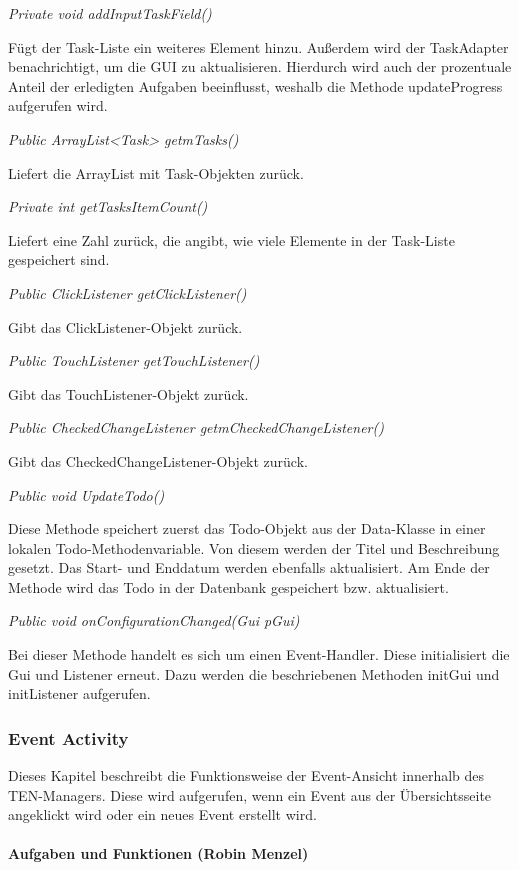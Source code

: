 \textit{Private void addInputTaskField()}

Fügt der Task-Liste ein weiteres Element hinzu. Außerdem wird der TaskAdapter benachrichtigt, um die GUI zu aktualisieren. Hierdurch wird auch der prozentuale Anteil der erledigten Aufgaben beeinflusst, weshalb die Methode updateProgress aufgerufen wird.

\textit{Public ArrayList<Task> getmTasks()}

Liefert die ArrayList mit Task-Objekten zurück.

\textit{Private int getTasksItemCount()}

Liefert eine Zahl zurück, die angibt, wie viele Elemente in der Task-Liste gespeichert sind.

\textit{Public ClickListener getClickListener()}

Gibt das ClickListener-Objekt zurück.

\textit{Public TouchListener getTouchListener()}

	Gibt das TouchListener-Objekt zurück.

\textit{Public CheckedChangeListener getmCheckedChangeListener()}

	Gibt das CheckedChangeListener-Objekt zurück.

\textit{Public void UpdateTodo()}

Diese Methode speichert zuerst das Todo-Objekt aus der Data-Klasse in einer lokalen Todo-Methodenvariable. Von diesem werden der Titel und Beschreibung gesetzt. Das Start- und Enddatum werden ebenfalls aktualisiert. Am Ende der Methode wird das Todo in der Datenbank gespeichert bzw. aktualisiert.

\textit{Public void onConfigurationChanged(Gui pGui)}

Bei dieser Methode handelt es sich um einen Event-Handler. Diese initialisiert die Gui und Listener erneut. Dazu werden die beschriebenen Methoden initGui und initListener aufgerufen.


\newpage
\subsubsection{Event Activity}
Dieses Kapitel beschreibt die Funktionsweise der Event-Ansicht innerhalb des TEN-Managers. Diese wird aufgerufen, wenn ein Event aus der Übersichtsseite angeklickt wird oder ein neues Event erstellt wird.

\paragraph{Aufgaben und Funktionen (Robin Menzel)}

